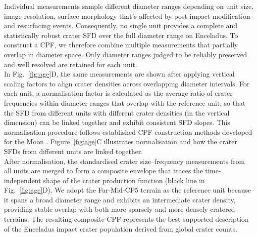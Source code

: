 \documentclass[preprint,11pt,3p,times,authoryear]{elsarticle}
\begin{document}
Individual measurements sample different diameter ranges depending on unit size, image resolution, surface morphology that's affected by post-impact modification and resurfacing events. Consequently, no single unit provides a complete and statistically robust crater SFD over the full diameter range on Enceladus. To construct a CPF, we therefore combine multiple measurements that partially overlap in diameter space. Only diameter ranges judged to be reliably preserved and well resolved are retained for each unit.\\

In Fig.~\ref{fig:age}D, the same measurements are shown after applying vertical scaling factors to align crater densities across overlapping diameter intervals. For each unit, a normalisation factor is calculated as the average ratio of crater frequencies within diameter ranges that overlap with the reference unit, so that the SFD from different units with different crater densities (in the vertical dimension) can be linked together and exhibit consistent SFD slopes. This normalisation procedure follows established CPF construction methods developed for the Moon \citep{Neukum1975, Neukum1983, Werner2005}. Figure~\ref{fig:age}C illustrates normalisation and how the crater SFDs from different units are linked together.\\

After normalisation, the standardised crater size–frequency measurements from all units are merged to form a composite envelope that traces the time-independent shape of the crater production function (black line in Fig.~\ref{fig:age}D). We adopt the Far-Mid-CP5 terrain as the reference unit because it spans a broad diameter range and exhibits an intermediate crater density, providing stable overlap with both more sparsely and more densely cratered terrains. The resulting composite CPF represents the best-supported description of the Enceladus impact crater population derived from global crater counts.
\end{document}
